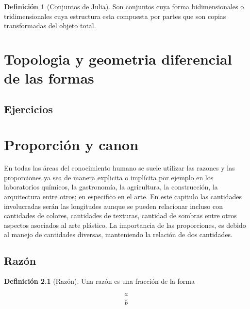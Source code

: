 \documentclass[
  11pt,
]{krantz}
\theoremstyle{definition}
\newtheorem{definition}{Definición}[chapter]
\theoremstyle{definition}
\theoremstyle{definition}
\theoremstyle{definition}
\theoremstyle{remark}
\begin{document}
\begin{definition}[Conjuntos de Julia]
\protect\hypertarget{def:julia}{}\label{def:julia}Son conjuntos cuya forma bidimensionales o tridimensionales cuya estructura esta compuesta por partes que son copias transformadas del objeto total.
\end{definition}

\hypertarget{topologia-y-geometria-diferencial-de-las-formas}{%
\chapter{Topologia y geometria diferencial de las formas}\label{topologia-y-geometria-diferencial-de-las-formas}}

\citep{vincze2014college}

\hypertarget{ejercicios-1}{%
\section{Ejercicios}\label{ejercicios-1}}

\hypertarget{appendix-apendice}{%
\appendix {}}


\hypertarget{intro}{%
\chapter{Proporción y canon}\label{intro}}

En todas las áreas del conocimiento humano se suele utilizar las razones y las proporciones ya sea de manera explicita o implícita por ejemplo en los laboratorios químicos, la gastronomía, la agricultura, la construcción, la arquitectura entre otros; en especifico en el arte. En este capitulo las cantidades involucradas serán las longitudes aunque se pueden relacionar incluso con cantidades de colores, cantidades de texturas, cantidad de sombras entre otros aspectos asociados al arte plástico. La importancia de las proporciones, es debido al manejo de cantidades diversas, manteniendo la relación de dos cantidades.

\hypertarget{razuxf3n}{%
\section{Razón}\label{razuxf3n}}

\begin{definition}[Razón]
\protect\hypertarget{def:razon}{}\label{def:razon}Una razón es una fracción de la forma

\[
\frac{a}{b}\label{eq:fraccion}
\]
\end{definition}
\end{document}
